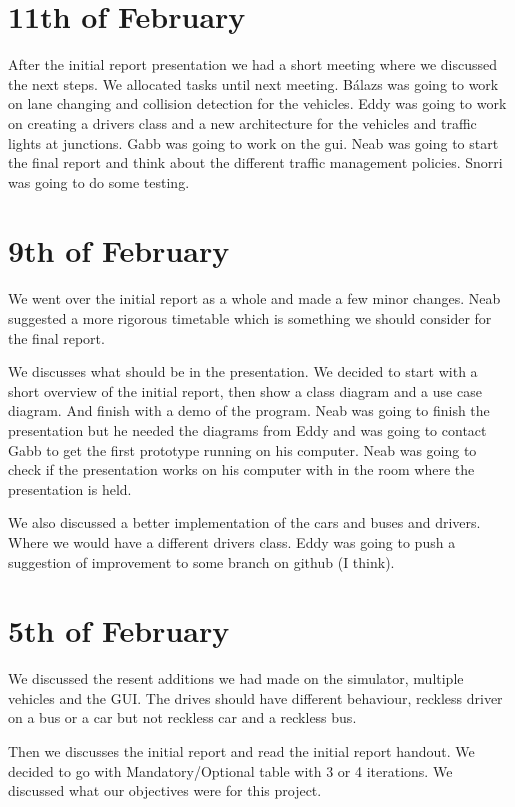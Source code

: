 \documentclass[11pt]{article}
\begin{document}
 

\section{11th of February}
After the initial report presentation we had a short meeting where we discussed the next steps. We allocated tasks until next meeting. Bálazs was going to work on lane changing and collision detection for the vehicles. Eddy was going to work on creating a drivers class and a new architecture for the vehicles and traffic lights at junctions. Gabb was going to work on the gui. Neab was going to start the final report and think about the different traffic management policies. Snorri was going to do some testing. 

\section{9th of February}
We went over the initial report as a whole and made a few minor changes. Neab suggested a more rigorous timetable which is something we should consider for the final report.

We discusses what should be in the presentation. We decided to start with a short overview of the initial report, then show a class diagram and a use case diagram. And finish with a demo of the program. Neab was going to finish the presentation but he needed the diagrams from Eddy and was going to contact Gabb to get the first prototype running on his computer. Neab was going to check if the presentation works on his computer with in the room where the presentation is held.

We also discussed a better implementation of the cars and buses and drivers. Where we would have a different drivers class. Eddy was going to push a suggestion of improvement to some branch on github (I think).

\section{5th of February}
We discussed the resent additions we had made on the simulator, multiple vehicles and the GUI. The drives should have different behaviour, reckless driver on a bus or a car but not reckless car and a reckless bus.

Then we discusses the initial report and read the initial report handout. We decided to go with Mandatory/Optional table with 3 or 4 iterations. We discussed what our objectives were for this project.
\end{document}
